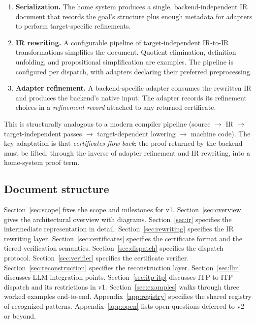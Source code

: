 \documentclass[11pt,letterpaper]{article}
\theoremstyle{definition}
\theoremstyle{remark}
\begin{document}
\begin{enumerate}[leftmargin=2em]
  \item \textbf{Serialization.} The home system produces a single,
        backend-independent IR document that records the goal's structure
        plus enough metadata for adapters to perform target-specific
        refinements.
  \item \textbf{IR rewriting.} A configurable pipeline of target-independent
        IR-to-IR transformations simplifies the document. Quotient elimination,
        definition unfolding, and propositional simplification are examples.
        The pipeline is configured per dispatch, with adapters declaring
        their preferred preprocessing.
  \item \textbf{Adapter refinement.} A backend-specific adapter consumes
        the rewritten IR and produces the backend's native input. The
        adapter records its refinement choices in a \emph{refinement record}
        attached to any returned certificate.
\end{enumerate}

This is structurally analogous to a modern compiler pipeline (source $\to$
IR $\to$ target-independent passes $\to$ target-dependent lowering $\to$
machine code). The key adaptation is that \emph{certificates flow back}:
the proof returned by the backend must be lifted, through the inverse of
adapter refinement and IR rewriting, into a home-system proof term.

\subsection{Document structure}

Section~\ref{sec:scope} fixes the scope and milestones for v1. Section~\ref{sec:overview}
gives the architectural overview with diagrams. Section~\ref{sec:ir} specifies the
intermediate representation in detail. Section~\ref{sec:rewriting} specifies the
IR rewriting layer. Section~\ref{sec:certificates} specifies the certificate format
and the tiered verification semantics. Section~\ref{sec:dispatch} specifies the
dispatch protocol. Section~\ref{sec:verifier} specifies the certificate verifier.
Section~\ref{sec:reconstruction} specifies the reconstruction layer.
Section~\ref{sec:llm} discusses LLM integration points. Section~\ref{sec:itp-itp}
discusses ITP-to-ITP dispatch and its restrictions in v1. Section~\ref{sec:examples}
walks through three worked examples end-to-end. Appendix~\ref{app:registry}
specifies the shared registry of recognized patterns. Appendix~\ref{app:open}
lists open questions deferred to v2 or beyond.
\end{document}
